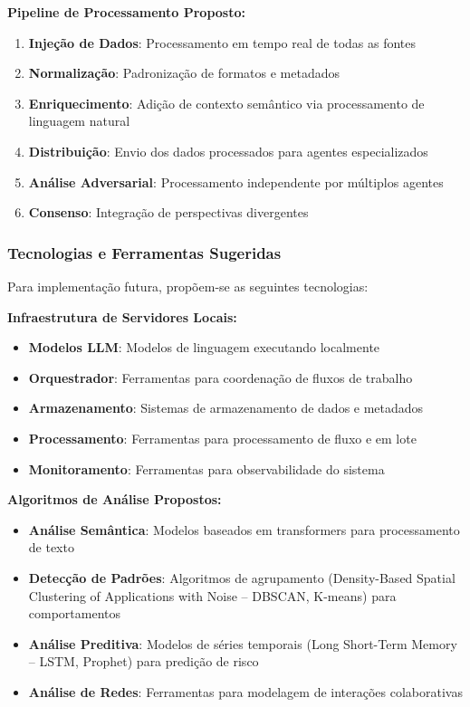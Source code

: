 \documentclass[english, spanish, brazilian]{modelo_dt}
\begin{document}
\textbf{Pipeline de Processamento Proposto:}
\begin{enumerate}
  \item \textbf{Injeção de Dados}: Processamento em tempo real de todas as fontes
  \item \textbf{Normalização}: Padronização de formatos e metadados
  \item \textbf{Enriquecimento}: Adição de contexto semântico via processamento de linguagem natural
  \item \textbf{Distribuição}: Envio dos dados processados para agentes especializados
  \item \textbf{Análise Adversarial}: Processamento independente por múltiplos agentes
  \item \textbf{Consenso}: Integração de perspectivas divergentes
\end{enumerate}

\subsubsection{Tecnologias e Ferramentas Sugeridas}

Para implementação futura, propõem-se as seguintes tecnologias:

\textbf{Infraestrutura de Servidores Locais:}
\begin{itemize}
  \item \textbf{Modelos LLM}: Modelos de linguagem executando localmente
  \item \textbf{Orquestrador}: Ferramentas para coordenação de fluxos de trabalho
  \item \textbf{Armazenamento}: Sistemas de armazenamento de dados e metadados
  \item \textbf{Processamento}: Ferramentas para processamento de fluxo e em lote
  \item \textbf{Monitoramento}: Ferramentas para observabilidade do sistema
\end{itemize}

\textbf{Algoritmos de Análise Propostos:}
\begin{itemize}
  \item \textbf{Análise Semântica}: Modelos baseados em transformers para processamento de texto
  \item \textbf{Detecção de Padrões}: Algoritmos de agrupamento (Density-Based Spatial Clustering of Applications with Noise -- DBSCAN, K-means) para comportamentos
  \item \textbf{Análise Preditiva}: Modelos de séries temporais (Long Short-Term Memory -- LSTM, Prophet) para predição de risco
  \item \textbf{Análise de Redes}: Ferramentas para modelagem de interações colaborativas
\end{itemize}
\end{document}
